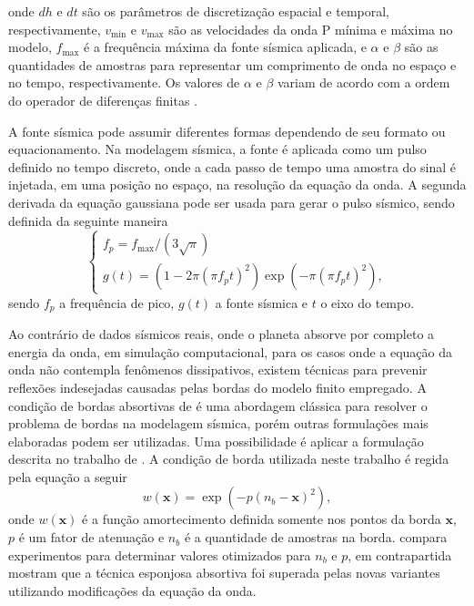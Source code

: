 \noindent onde $dh$ e $dt$ são os parâmetros de discretização espacial e temporal, respectivamente, $v_{\text{min}}$ e $v_{\text{max}}$ são as velocidades da onda P mínima e máxima no modelo, $f_{\text{max}}$ é a frequência máxima da fonte sísmica aplicada, e $\alpha$ e $\beta$ são as quantidades de amostras para representar um comprimento de onda no espaço e no tempo, respectivamente. Os valores de $\alpha$ e $\beta$ variam de acordo com a ordem do operador de diferenças finitas \cite{moczo2000stability, bulcao2004modelagem}.    

A fonte sísmica pode assumir diferentes formas dependendo de seu formato ou equacionamento. Na modelagem sísmica, a fonte é aplicada como um pulso definido no tempo discreto, onde a cada passo de tempo uma amostra do sinal é injetada, em uma posição no espaço, na resolução da equação da onda. A segunda derivada da equação gaussiana \cite{ricker1953form} pode ser usada para gerar o pulso sísmico, sendo definida da seguinte maneira
\begin{equation}
	\begin{cases}
		f_p = f_{\text{max}} / (3\sqrt{\pi}) \\
		g(t) = (1 - 2 \pi (\pi f_p t)^2) \exp(-\pi (\pi f_p t)^2),
		\label{ricker}
	\end{cases}
\end{equation}
\noindent sendo $f_p$ a frequência de pico, $g(t)$ a fonte sísmica e $t$ o eixo do tempo. 

Ao contrário de dados sísmicos reais, onde o planeta absorve por completo a energia da onda, em simulação computacional, para os casos onde a equação da onda não contempla fenômenos dissipativos, existem técnicas para prevenir reflexões indesejadas causadas pelas bordas do modelo finito empregado. A condição de bordas absortivas de  é uma abordagem clássica para resolver o problema de bordas na modelagem sísmica, porém outras formulações mais elaboradas podem ser utilizadas. Uma possibilidade é aplicar a formulação descrita no trabalho de . A condição de borda utilizada neste trabalho é regida pela equação a seguir
\begin{equation}
	w(\mathbf{x}) = \exp(- p(n_b - \mathbf{x})^2),
	\label{cerjan}	
\end{equation}      
\noindent onde $w(\mathbf{x})$ é a função amortecimento definida somente nos pontos da borda $\mathbf{x}$, $p$ é um fator de atenuação e $n_b$ é a quantidade de amostras na borda.  compara experimentos para determinar valores otimizados para $n_b$ e $p$, em contrapartida  mostram que a técnica esponjosa absortiva foi superada pelas novas variantes utilizando modificações da equação da onda. 

